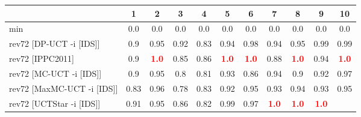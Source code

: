 \documentclass{article}
\begin{document}
\begin{tabular}{|l|r@{$\pm$}rr@{$\pm$}rr@{$\pm$}rr@{$\pm$}rr@{$\pm$}rr@{$\pm$}rr@{$\pm$}rr@{$\pm$}rr@{$\pm$}rr@{$\pm$}r|}
\hline

& \multicolumn{2}{c}{1}
& \multicolumn{2}{c}{2}
& \multicolumn{2}{c}{3}
& \multicolumn{2}{c}{4}
& \multicolumn{2}{c}{5}
& \multicolumn{2}{c}{6}
& \multicolumn{2}{c}{7}
& \multicolumn{2}{c}{8}
& \multicolumn{2}{c}{9}
& \multicolumn{2}{c|}{10}
\\
\hline
\hline
min
& \multicolumn{2}{c}{0.0}
& \multicolumn{2}{c}{0.0}
& \multicolumn{2}{c}{0.0}
& \multicolumn{2}{c}{0.0}
& \multicolumn{2}{c}{0.0}
& \multicolumn{2}{c}{0.0}
& \multicolumn{2}{c}{0.0}
& \multicolumn{2}{c}{0.0}
& \multicolumn{2}{c}{0.0}
& \multicolumn{2}{c|}{0.0}
\\
rev72 [DP-UCT -i [IDS]]
& \multicolumn{2}{c}{0.9}
& \multicolumn{2}{c}{0.95}
& \multicolumn{2}{c}{0.92}
& \multicolumn{2}{c}{0.83}
& \multicolumn{2}{c}{0.94}
& \multicolumn{2}{c}{0.98}
& \multicolumn{2}{c}{0.94}
& \multicolumn{2}{c}{0.95}
& \multicolumn{2}{c}{0.99}
& \multicolumn{2}{c|}{0.99}
\\
rev72 [IPPC2011]
& \multicolumn{2}{c}{0.9}
& \multicolumn{2}{c}{\textbf{\textcolor{red}{1.0}}}
& \multicolumn{2}{c}{0.85}
& \multicolumn{2}{c}{0.86}
& \multicolumn{2}{c}{\textbf{\textcolor{red}{1.0}}}
& \multicolumn{2}{c}{\textbf{\textcolor{red}{1.0}}}
& \multicolumn{2}{c}{0.88}
& \multicolumn{2}{c}{\textbf{\textcolor{red}{1.0}}}
& \multicolumn{2}{c}{0.94}
& \multicolumn{2}{c|}{\textbf{\textcolor{red}{1.0}}}
\\
rev72 [MC-UCT -i [IDS]]
& \multicolumn{2}{c}{0.9}
& \multicolumn{2}{c}{0.95}
& \multicolumn{2}{c}{0.8}
& \multicolumn{2}{c}{0.81}
& \multicolumn{2}{c}{0.93}
& \multicolumn{2}{c}{0.86}
& \multicolumn{2}{c}{0.94}
& \multicolumn{2}{c}{0.9}
& \multicolumn{2}{c}{0.92}
& \multicolumn{2}{c|}{0.97}
\\
rev72 [MaxMC-UCT -i [IDS]]
& \multicolumn{2}{c}{0.83}
& \multicolumn{2}{c}{0.96}
& \multicolumn{2}{c}{0.78}
& \multicolumn{2}{c}{0.83}
& \multicolumn{2}{c}{0.92}
& \multicolumn{2}{c}{0.95}
& \multicolumn{2}{c}{0.93}
& \multicolumn{2}{c}{0.94}
& \multicolumn{2}{c}{0.93}
& \multicolumn{2}{c|}{0.95}
\\
rev72 [UCTStar -i [IDS]]
& \multicolumn{2}{c}{0.91}
& \multicolumn{2}{c}{0.95}
& \multicolumn{2}{c}{0.86}
& \multicolumn{2}{c}{0.82}
& \multicolumn{2}{c}{0.99}
& \multicolumn{2}{c}{0.97}
& \multicolumn{2}{c}{\textbf{\textcolor{red}{1.0}}}
& \multicolumn{2}{c}{\textbf{\textcolor{red}{1.0}}}
& \multicolumn{2}{c}{\textbf{\textcolor{red}{1.0}}}

\end{tabular}
\end{document}
